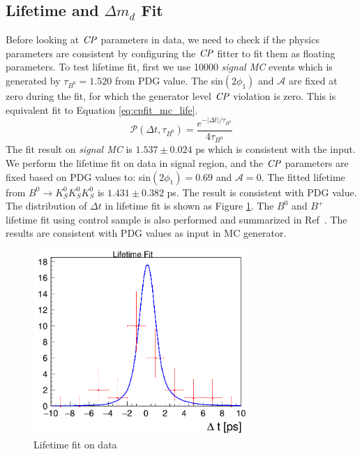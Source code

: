 \subsection{Lifetime and $\Delta m_d$ Fit}
Before looking at $\it{CP}$ parameters in data, we need to check if the physics parameters are consistent by configuring the $\it{CP}$ fitter to fit them as floating parameters. To test lifetime fit, first we use 10000 \textit{signal MC} events which is generated by $\tau_{B^0} = 1.520$ from PDG value. The sin$(2\phi_1)$ and $\mathcal{A}$ are fixed at zero during the fit, for which the generator level $\it{CP}$ violation is zero. This is equivalent fit to Equation \ref{eq:cpfit_mc_life}.
\begin{equation}\label{eq:cpfit_mc_life}
\mathcal{P}(\Delta t,\tau_{B^0}) = 
\frac{e^{-|\Delta t|/\tau_{B^0}}}{4\tau_{B^0}}
\end{equation}
The fit result on \textit{signal MC} is $1.537 \pm 0.024$ ps which is consistent with the input. We perform the lifetime fit on data in signal region, and the $\it{CP}$ parameters are fixed based on PDG values to: sin$(2\phi_1)=0.69$ and $\mathcal{A} = 0$. The fitted lifetime from $B^0 \to K_S^0  K_S^0  K_S^0$ is $1.431\pm 0.382$ ps. The result is consistent with PDG value. The distribution of $\Delta t$ in lifetime fit is shown as Figure \ref{fig:cpfit_data_life}.
The $B^0$ and $B^+$ lifetime fit using control sample is also performed and summarized in Ref~\cite{jpsiks_ichep}. The results are consistent with PDG values as input in MC generator. 
\begin{figure}[htpb]
	\centering
	\includegraphics[height=7cm]{figures/lifetime_data}
	\caption{Lifetime fit on data}
	\label{fig:cpfit_data_life}
\end{figure}


